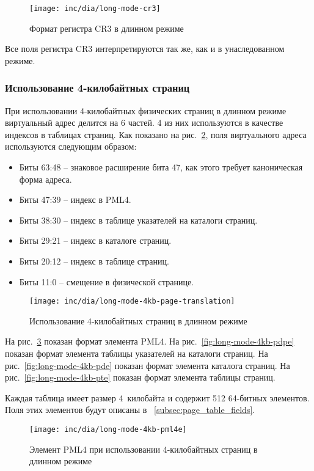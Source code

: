 \begin{figure}[ht]
  \centering
  \texttt{[image: inc/dia/long-mode-cr3]}
  \caption{Формат регистра CR3 в длинном режиме}
  \label{fig:long-mode-cr3}
\end{figure}

Все поля регистра CR3 интерпретируются так же, как и в унаследованном режиме.

\subsubsection*{Использование 4-килобайтных страниц}
При использовании 4-килобайтных физических страниц в длинном режиме виртуальный адрес делится на 6 частей.
4 из них используются в качестве индексов в таблицах страниц. Как показано на рис.~\ref{fig:long-mode-4kb-page-translation},
поля виртуального адреса используются следующим образом:
\begin{itemize}
\item Биты 63:48 -- знаковое расширение бита 47, как этого требует каноническая форма адреса.
\item Биты 47:39 -- индекс в PML4.
\item Биты 38:30 -- индекс в таблице указателей на каталоги страниц.
\item Биты 29:21 -- индекс в каталоге страниц.
\item Биты 20:12 -- индекс в таблице страниц.
\item Биты 11:0 -- смещение в физической странице.
\end{itemize}

\begin{figure}[ht]
  \centering
  \texttt{[image: inc/dia/long-mode-4kb-page-translation]}
  \caption{Использование 4-килобайтных страниц в длинном режиме}
  \label{fig:long-mode-4kb-page-translation}
\end{figure}

На рис.~\ref{fig:long-mode-4kb-pml4e} показан формат элемента PML4.
На рис.~\ref{fig:long-mode-4kb-pdpe} показан формат элемента таблицы указателей на каталоги страниц.
На рис.~\ref{fig:long-mode-4kb-pde} показан формат элемента каталога страниц.
На рис.~\ref{fig:long-mode-4kb-pte} показан формат элемента таблицы страниц.

Каждая таблица имеет размер 4~килобайта и содержит 512 64-битных элементов. Поля этих элементов
будут описаны в ~\ref{subsec:page_table_fields}.

\begin{figure}[ht]
  \centering
  \texttt{[image: inc/dia/long-mode-4kb-pml4e]}
  \caption{Элемент PML4 при использовании 4-килобайтных страниц в длинном режиме}
  \label{fig:long-mode-4kb-pml4e}
\end{figure}

